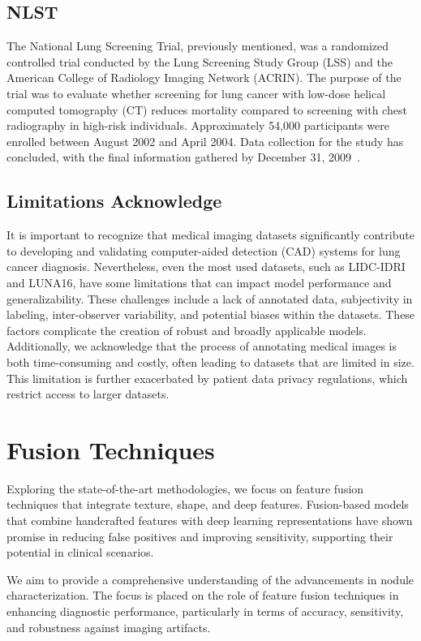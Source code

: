 \subsection{NLST}
The National Lung Screening Trial, previously mentioned, was a randomized controlled trial conducted by the Lung Screening Study Group (LSS) and the American College of Radiology Imaging Network (ACRIN). The purpose of the trial was to evaluate whether screening for lung cancer with low-dose helical computed tomography (CT) reduces mortality compared to screening with chest radiography in high-risk individuals. Approximately 54,000 participants were enrolled between August 2002 and April 2004. Data collection for the study has concluded, with the final information gathered by December 31, 2009~\cite{NLST2013,NLST}.

\subsection{Limitations Acknowledge}

It is important to recognize that medical imaging datasets significantly contribute to developing and validating computer-aided detection (CAD) systems for lung cancer diagnosis. Nevertheless, even the most used datasets, such as LIDC-IDRI and LUNA16, have some limitations that can impact model performance and generalizability. These challenges include a lack of annotated data, subjectivity in labeling, inter-observer variability, and potential biases within the datasets. These factors complicate the creation of robust and broadly applicable models. Additionally, we acknowledge that the process of annotating medical images is both time-consuming and costly, often leading to datasets that are limited in size. This limitation is further exacerbated by patient data privacy regulations, which restrict access to larger datasets.~\cite{Gu2021}


\section{Fusion Techniques}
Exploring the state-of-the-art methodologies, we focus on feature fusion techniques that integrate texture, shape, and deep features. Fusion-based models~\cite{Liu2023,Yutong2018} that combine handcrafted features with deep learning representations have shown promise in reducing false positives and improving sensitivity, supporting their potential in clinical scenarios.

We aim to provide a comprehensive understanding of the advancements in nodule characterization. The focus is placed on the role of feature fusion techniques in enhancing diagnostic performance, particularly in terms of accuracy, sensitivity, and robustness against imaging artifacts.

